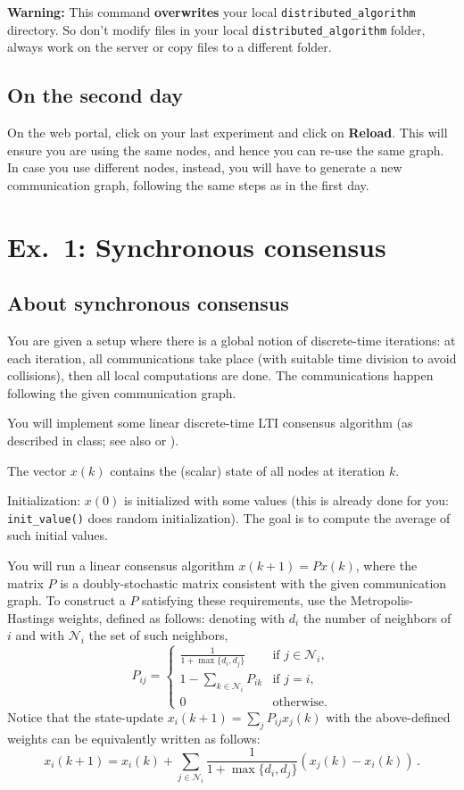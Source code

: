 \documentclass[oneside]{article}
\newcommand{\mc}{\mathcal}
\begin{document}
\textbf{Warning:} \quad This command \textbf{overwrites} your local \verb=distributed_algorithm= directory.  So don't modify files in your local \verb=distributed_algorithm= folder, always work on the server or copy files to a different folder.





\subsection{On the second day}
On the web portal, click on your last
experiment and click on \textbf{Reload}. This will ensure you are using the
same nodes, and hence you can re-use the same graph. In case you use different nodes, instead, you will have to generate a new communication graph, following the same steps as in the first day.




\section{Ex.~1: Synchronous consensus}

\subsection{About synchronous consensus}

You are given a setup where there is a global notion of discrete-time iterations:
at each iteration, all communications take place (with suitable time division to avoid collisions), then all local computations are done. The communications happen following the given communication graph.

You will implement some linear discrete-time LTI consensus algorithm (as described in class; see also \cite[Chapter~5]{bullo-book} or \cite{consensus-tutorial}).

The vector $x(k)$ contains the (scalar) state of all nodes at iteration $k$.

Initialization: $x(0)$ is initialized with some values (this is already done for you: \verb=init_value()= does random initialization). The goal is to compute the average of such initial values. 

You will run a linear consensus algorithm $x(k+1) = P x(k)$, where the matrix $P$ is a doubly-stochastic matrix consistent with the given communication graph. To construct a $P$ satisfying these requirements, use the Metropolis-Hastings weights, defined as follows:
denoting with $d_i$ the number of neighbors of $i$ and with $\mc N_i$ the set of such neighbors,
\[ P_{ij} =
\begin{cases}
\frac{1}{1+\max\{d_i, d_j \}} & \text{if $j \in \mc N_i$,}\\
1-\sum_{k \in \mc N_i} P_{ik} & \text{if $j = i$,}\\
0							  & \text{otherwise}.
\end{cases}
\]
Notice that the state-update $x_i(k+1) = \sum_j P_{ij} x_j(k)$ with the above-defined weights can be equivalently written as follows:
\[ x_i(k+1) = x_i(k) + \sum_{j \in \mc N_i} \frac{1}{1+\max\{d_i, d_j \}} (x_j(k) - x_i(k)) \,.\]
\end{document}
